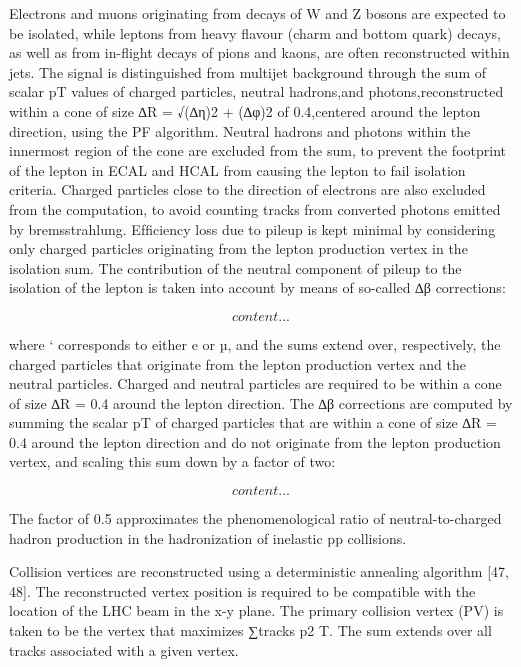 Electrons and muons originating from decays of W and Z bosons are expected to be isolated, while leptons from heavy ﬂavour (charm and bottom quark) decays, as well as from in-ﬂight decays of pions and kaons, are often reconstructed within jets. The signal is distinguished from multijet background through the sum of scalar pT values of charged particles, neutral hadrons,and photons,reconstructed within a cone of size ∆R = √(∆η)2 + (∆φ)2 of 0.4,centered around the lepton direction, using the PF algorithm. Neutral hadrons and photons within the innermost region of the cone are excluded from the sum, to prevent the footprint of the lepton in ECAL and HCAL from causing the lepton to fail isolation criteria. Charged particles close to the direction of electrons are also excluded from the computation, to avoid counting tracks from converted photons emitted by bremsstrahlung. Efﬁciency loss due to pileup is kept minimal by considering only charged particles originating from the lepton production vertex in the isolation sum. The contribution of the neutral component of pileup to the isolation of the lepton is taken into account by means of so-called ∆β corrections:

\begin{equation}
content...
\end{equation}

where ` corresponds to either e or µ, and the sums extend over, respectively, the charged particles that originate from the lepton production vertex and the neutral particles. Charged and neutral particles are required to be within a cone of size ∆R = 0.4 around the lepton direction. The ∆β corrections are computed by summing the scalar pT of charged particles that are within a cone of size ∆R = 0.4 around the lepton direction and do not originate from the lepton production vertex, and scaling this sum down by a factor of two: 

\begin{equation}
content...
\end{equation}

The factor of 0.5 approximates the phenomenological ratio of neutral-to-charged hadron production in the hadronization of inelastic pp collisions.

Collision vertices are reconstructed using a deterministic annealing algorithm [47, 48]. The reconstructed vertex position is required to be compatible with the location of the LHC beam in the x-y plane. The primary collision vertex (PV) is taken to be the vertex that maximizes ∑tracks p2 T. The sum extends over all tracks associated with a given vertex.

